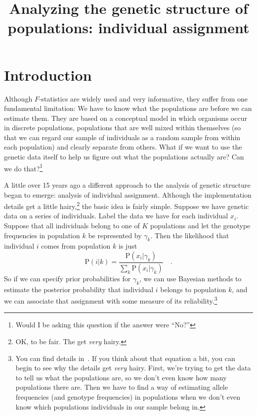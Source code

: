 \documentclass[12pt]{article}
\title{Analyzing the genetic structure of populations: individual assignment}
\begin{document}
\maketitle

\thispagestyle{first}

\section*{Introduction}

Although $F$-statistics are widely used and very informative, they
suffer from one fundamental limitation: We have to know what the
populations are before we can estimate them. They are based on a
conceptual model in which organisms occur in discrete populations,
populations that are well mixed within themselves (so that we can
regard our sample of individuals as a random sample from within each
population) and clearly separate from others. What if we want to use
the genetic data itself to help us figure out what the populations
actually are? Can we do that?\footnote{Would I be asking this question
  if the answer were ``No?''}

A little over 15 years ago a different approach to the analysis of
genetic structure began to emerge: analysis of individual
assignment. Although the implementation
details get a little hairy,\footnote{OK, to be fair. The get {\it
    very\/} hairy.} the basic idea is fairly simple. Suppose we have
genetic data on a series of individuals. Label the data we have for
each individual $x_i$. Suppose that all individuals belong to one of
$K$ populations and let the genotype frequencies in population $k$ be
represented by $\gamma_k$. Then the likelihood that individual $i$
comes from population $k$ is just
\[
\mbox{P}(i|k) = \frac{\mbox{P}(x_i|\gamma_k)}{\sum_k
  \mbox{P}(x_i|\gamma_k)} \quad .
\]
So if we can specify prior probabilities for $\gamma_k$, we can use
Bayesian methods to estimate the posterior probability that individual
$i$ belongs to population $k$, and we can associate that assignment
with some measure of its reliability.\footnote{You can find details
  in~\cite{Pritchard-etal-2000}. If you think about that equation a
  bit, you can begin to see why the details get {\it very\/}
  hairy. First, we're trying to get the data to tell us what the
  populations are, so we don't even know how many populations there
  are. Then we have to find a way of estimating allele frequencies
  (and genotype frequencies) in populations when we don't even
  know which populations individuals in our sample belong in.}
\end{document}
